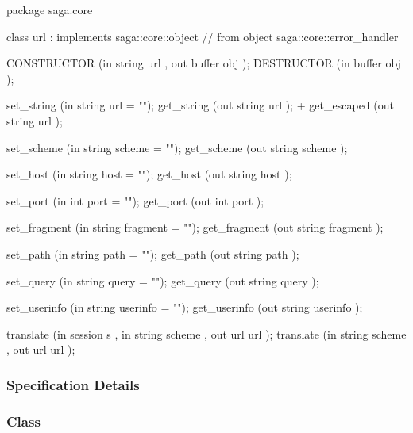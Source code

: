  \begin{myspec}
  package saga.core
  {
    class url : implements   saga::core::object
             // from object  saga::core::error_handler
    {
      CONSTRUCTOR   (in  string     url       ,
                     out buffer     obj       );
      DESTRUCTOR    (in  buffer     obj       );
 
      set_string    (in  string     url       = "");
      get_string    (out string     url       );
+     get_escaped   (out string     url       );
 
      set_scheme    (in  string     scheme    = "");
      get_scheme    (out string     scheme    );
 
      set_host      (in  string     host      = "");
      get_host      (out string     host      );
 
      set_port      (in  int        port      = "");
      get_port      (out int        port      );
 
      set_fragment  (in  string     fragment  = "");
      get_fragment  (out string     fragment  );
 
      set_path      (in  string     path      = "");
      get_path      (out string     path      );
 
      set_query     (in  string     query     = "");
      get_query     (out string     query     );
 
      set_userinfo  (in  string     userinfo  = "");
      get_userinfo  (out string     userinfo  );
 
      translate     (in  session    s         ,
                     in  string     scheme    ,
                     out url        url       );
      translate     (in  string     scheme    ,
                     out url        url       );
    }
  }
 \end{myspec}
 
 
 \subsubsection{Specification Details}
 
 \subsubsection*{Class }
 
